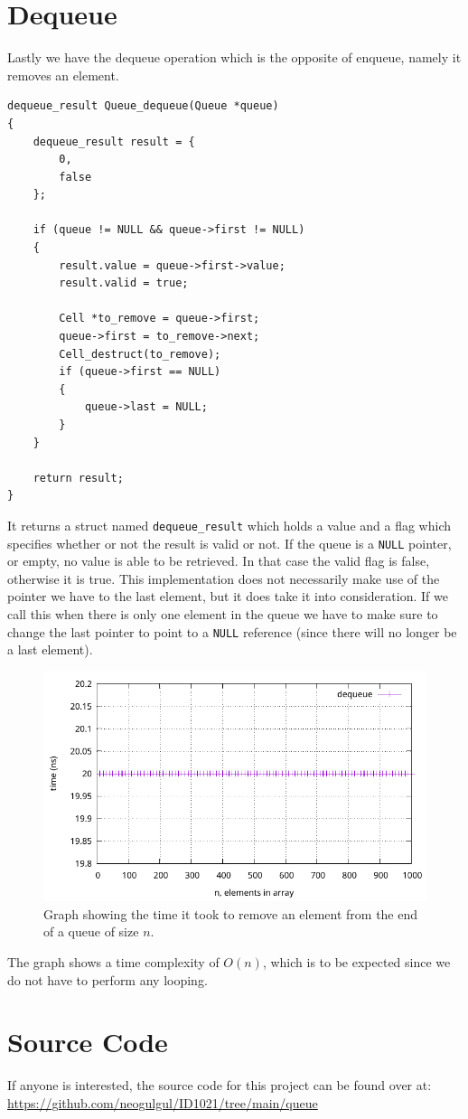 \documentclass[a4paper, 11pt]{article}
\begin{document}
\section{Dequeue}
	Lastly we have the dequeue operation which is the opposite of enqueue, namely it removes an element.
	\begin{verbatim}
dequeue_result Queue_dequeue(Queue *queue)
{
	dequeue_result result = {
		0,
		false
	};

	if (queue != NULL && queue->first != NULL)
	{
		result.value = queue->first->value;
		result.valid = true;

		Cell *to_remove = queue->first;
		queue->first = to_remove->next;
		Cell_destruct(to_remove);
		if (queue->first == NULL)
		{
			queue->last = NULL;
		}
	}

	return result;
}
	\end{verbatim}
	It returns a struct named \texttt{dequeue\_result} which holds a value and a flag which specifies whether or not the result is valid or not.
	If the queue is a \texttt{NULL} pointer, or empty, no value is able to be retrieved.
	In that case the valid flag is false, otherwise it is true.
	This implementation does not necessarily make use of the pointer we have to the last element,
	but it does take it into consideration.
	If we call this when there is only one element in the queue we have to make sure to change the last pointer to point to a \texttt{NULL} reference
	(since there will no longer be a last element).
	\begin{figure}[H]
		\centering
		\includegraphics[scale=0.8]{graphs/dequeue.pdf}
		\caption{
			Graph showing the time it took to remove an element from the end of a queue of size \(n\).
		}
	\end{figure}
	The graph shows a time complexity of \(O(n)\), which is to be expected since we do not have to perform any looping.

\section{Source Code}
	If anyone is interested, the source code for this project can be found over at:
	\url{https://github.com/neogulgul/ID1021/tree/main/queue}
\end{document}

